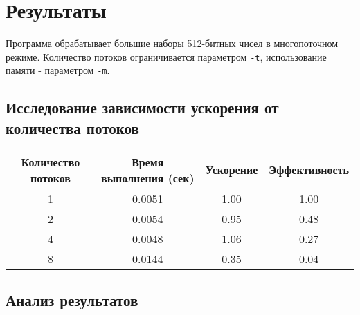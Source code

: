 \documentclass[12pt,a4paper]{article}
\begin{document}
\section*{Результаты}
Программа обрабатывает большие наборы 512-битных чисел в многопоточном режиме. Количество потоков ограничивается параметром \texttt{-t}, использование памяти - параметром \texttt{-m}.

\subsection*{Исследование зависимости ускорения от количества потоков}

\begin{table}[h]
\centering
\begin{tabular}{|c|c|c|c|}
\hline
\textbf{Количество потоков} & \textbf{Время выполнения (сек)} & \textbf{Ускорение} & \textbf{Эффективность} \\
\hline
1 & 0.0051 & 1.00 & 1.00 \\
\hline
2 & 0.0054 & 0.95 & 0.48 \\
\hline
4 & 0.0048 & 1.06 & 0.27 \\
\hline
8 & 0.0144 & 0.35 & 0.04 \\
\hline
\end{tabular}
\end{table}

\subsection*{Анализ результатов}
\end{document}
